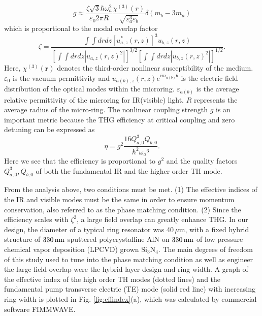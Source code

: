 \documentclass[9pt,twocolumn,twoside]{optica}
\begin{document}
%
\begin{equation}
g\approx\frac{\zeta\sqrt{3}\hbar\omega_{a}^{2}}{\varepsilon_{0}2\pi R}\frac{\chi^{(3)}(r)}{\sqrt{\varepsilon_{a}^{3}\varepsilon_{b}}}\delta(m_{b}-3m_{a})
\label{eq:g}
\end{equation}
%
which is proportional to the modal overlap factor
%
\begin{equation}
\zeta=\frac{\int\int drdz[u_{a,z}^{*}(r,z)]^{3}u_{b,z}(r,z)}{\left[\int\int drdz|u_{a,z}(r,z)^{2}|\right]^{3/2}\left[\int\int drdz|u_{b,z}(r,z)^{2}|\right]^{1/2}}.
\label{eq:zeta}
\end{equation}
Here, $\chi^{(3)}(\textbf{r})$ denotes the third-order nonlinear susceptibility of the medium. $\varepsilon_{0}$ is the vacuum permittivity and $u_{a(b),z}(r,z)e^{im_{a(b)}\theta}$ is the electric field distribution of the optical modes within the microring. $\varepsilon_{a(b)}$ is the average relative permittivity of the microring for IR(visible) light. $R$ represents the average radius of the micro-ring. The nonlinear coupling strength $g$ is an important metric because the THG efficiency at critical coupling and zero detuning can be expressed as
%
\begin{equation}
\eta=g^{2}\frac{16Q_{a,0}^{3}Q_{b,0}}{\hbar^{2}\omega_{a}{}^{6}}.
\label{eq:efficiency}
\end{equation}
Here we see that the efficiency is proportional to $g^{2}$ and the quality factors $Q_{a,0}^{3}, Q_{b,0}$ of both the fundamental IR and the higher order TH mode.

From the analysis above, two conditions must be met. (1) The effective indices of the IR and visible modes must be the same in order to ensure momentum conservation, also referred to as the phase matching condition. (2) Since the efficiency scales with $\zeta^{2}$, a large field overlap can greatly enhance THG. In our design, the diameter of a typical ring resonator was 40$\,\mu \mathrm{m}$, with a fixed hybrid structure of $330\thinspace\mathrm{nm}$ sputtered polycrystalline AlN on $330\thinspace\mathrm{nm}$ of low pressure chemical vapor deposition (LPCVD) grown $\mathrm{Si_{3}N_{4}}$. The main degrees of freedom of this study used to tune into the phase matching condition as well as engineer the large field overlap were the hybrid layer design and ring width. A graph of the effective index of the high order TH modes (dotted lines) and the fundamental pump transverse electric (TE) mode (solid red line) with increasing ring width is plotted in Fig. \ref{fig:effindex}(a), which was calculated by commercial software FIMMWAVE. 
\end{document}
